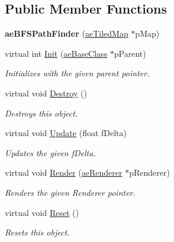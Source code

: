 \subsection*{Public Member Functions}
\begin{DoxyCompactItemize}
\item 
{\bfseries ae\+B\+F\+S\+Path\+Finder} (\hyperlink{classae_tiled_map}{ae\+Tiled\+Map} $\ast$p\+Map)\hypertarget{classae_b_f_s_path_finder_a6dabc113b1ef3ac90848ae78b8be5113}{}\label{classae_b_f_s_path_finder_a6dabc113b1ef3ac90848ae78b8be5113}

\item 
virtual int \hyperlink{classae_b_f_s_path_finder_a23a16f3e98f5c9fc3a6f56a26a7bf170}{Init} (\hyperlink{classae_base_class}{ae\+Base\+Class} $\ast$p\+Parent)
\begin{DoxyCompactList}\small\item\em Initializes with the given parent pointer. \end{DoxyCompactList}\item 
virtual void \hyperlink{classae_b_f_s_path_finder_a8221d21fdac79228e84aa104d30ee169}{Destroy} ()\hypertarget{classae_b_f_s_path_finder_a8221d21fdac79228e84aa104d30ee169}{}\label{classae_b_f_s_path_finder_a8221d21fdac79228e84aa104d30ee169}

\begin{DoxyCompactList}\small\item\em Destroys this object. \end{DoxyCompactList}\item 
virtual void \hyperlink{classae_b_f_s_path_finder_a00ddec6c4b37a3df127d1354cbc37635}{Update} (float f\+Delta)
\begin{DoxyCompactList}\small\item\em Updates the given f\+Delta. \end{DoxyCompactList}\item 
virtual void \hyperlink{classae_b_f_s_path_finder_a21efc2e873dd066f012ce0ef972a4a85}{Render} (\hyperlink{classae_core_1_1ae_renderer}{ae\+Renderer} $\ast$p\+Renderer)
\begin{DoxyCompactList}\small\item\em Renders the given Renderer pointer. \end{DoxyCompactList}\item 
virtual void \hyperlink{classae_b_f_s_path_finder_a3084aac6b6af17754b857915670a831e}{Reset} ()\hypertarget{classae_b_f_s_path_finder_a3084aac6b6af17754b857915670a831e}{}\label{classae_b_f_s_path_finder_a3084aac6b6af17754b857915670a831e}

\begin{DoxyCompactList}\small\item\em Resets this object. \end{DoxyCompactList}\end{DoxyCompactItemize}
